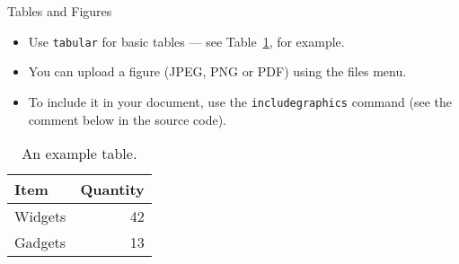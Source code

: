 \begin{frame}{Tables and Figures}

\begin{itemize}
\item Use \texttt{tabular} for basic tables --- see Table~\ref{tab:widgets}, for example.
\item You can upload a figure (JPEG, PNG or PDF) using the files menu. 
\item To include it in your document, use the \texttt{includegraphics} command (see the comment below in the source code).
\end{itemize}


\begin{table}
\centering
\begin{tabular}{l|r}
Item & Quantity \\\hline
Widgets & 42 \\
Gadgets & 13
\end{tabular}
\caption{\label{tab:widgets}An example table.}
\end{table}

\end{frame}